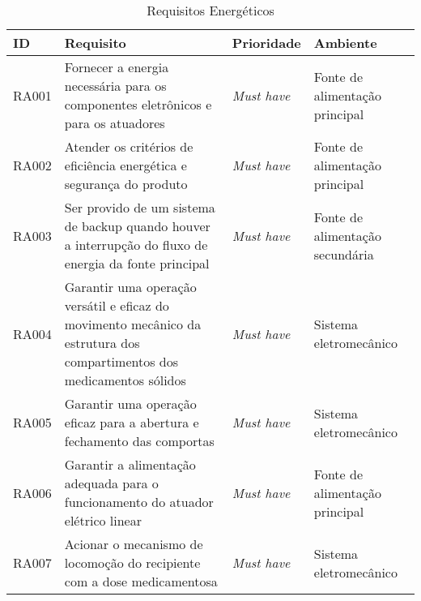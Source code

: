 \begin{table}[H]
    \centering
    \caption{Requisitos Energéticos}
    \begin{adjustbox}{max width = \textwidth}
        \begin{tabular}{|L{1.5cm}|L{8.5cm}|C{2.5cm}|C{3.5cm}|}
        \hline
        \textbf{ID} & \textbf{Requisito} & \textbf{Prioridade} & \textbf{Ambiente} \\
        \hline
        RA001 & Fornecer a energia necessária para os componentes eletrônicos e para os atuadores & \textit{Must have}  & Fonte de alimentação principal \\ 
        \hline
        
        RA002 & Atender os critérios de eficiência energética e segurança do produto & \textit{Must have} & Fonte de alimentação principal \\
        \hline
        
        RA003 & Ser provido de um sistema de backup quando houver a interrupção do fluxo de energia da fonte principal & \textit{Must have} & Fonte de alimentação secundária \\ 
        \hline
        
        RA004 & Garantir uma operação versátil e eficaz do movimento mecânico da estrutura dos compartimentos dos medicamentos sólidos & \textit{Must have} & Sistema eletromecânico\\ 
        \hline
        
        RA005 & Garantir uma operação eficaz para a abertura e fechamento das comportas & \textit{Must have} & Sistema eletromecânico \\ 
        \hline
        
        RA006 & Garantir a alimentação adequada para o funcionamento do atuador elétrico linear& \textit{Must have} & Fonte de alimentação principal \\ \hline
        
        RA007 & Acionar o mecanismo de locomoção do recipiente com a dose medicamentosa& \textit{Must have} & Sistema eletromecânico\\ 
        \hline
        
        \end{tabular}
    \end{adjustbox}
    \label{tab:req_energeticos}
\end{table}

